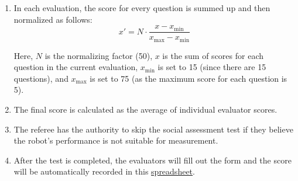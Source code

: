 \begin{enumerate}
    \item In each evaluation, the score for every question is summed up and then normalized as follows:
    \[ x' = N \cdot \frac{{x - x_{\text{min}}}}{{x_{\text{max}} - x_{\text{min}}}} \]

    Here, \( N \) is the normalizing factor (50), \( x \) is the sum of scores for each question in the current evaluation, \( x_{\text{min}} \) is set to 15 (since there are 15 questions), and \( x_{\text{max}} \) is set to 75 (as the maximum score for each question is 5).
    
    \item The final score is calculated as the average of individual evaluator scores.
      
    \item The referee has the authority to skip the social assessment test if they believe the robot's performance is not suitable for measurement.
    
    \item After the test is completed, the evaluators will fill out the form and the score will be automatically recorded in this \href{https://urjc-my.sharepoint.com/:x:/g/personal/juan_pena_urjc_es/Eb4WyP1H4-FCqeW-qVZ3mF0BRzBR1Cn-J5ltluy90fhTJQ?rtime=guRqYF483Eg}{spreadsheet}.
\end{enumerate}

